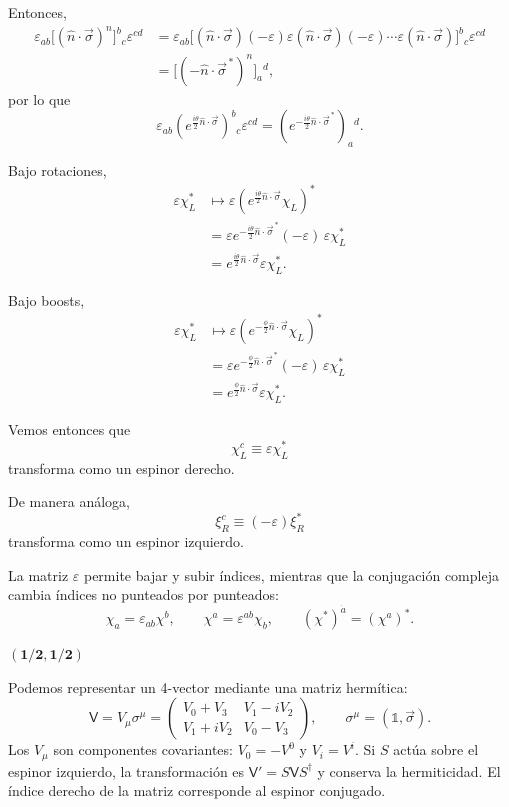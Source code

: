 \documentclass[11pt,a4paper]{article}
\begin{document}
Entonces,
\begin{align*}
  \varepsilon_{ab}
  \bigl[(\hat n\cdot\vec\sigma)^n\bigr]^b{}_c
  \varepsilon^{cd}
  &=\varepsilon_{ab}
    \bigl[(\hat n\cdot\vec\sigma)(-\varepsilon)
           \varepsilon(\hat n\cdot\vec\sigma)(-\varepsilon)
           \cdots
           \varepsilon(\hat n\cdot\vec\sigma)
    \bigr]^b{}_c
    \varepsilon^{cd} \\
  &=\bigl[(-\hat n\cdot\vec\sigma^{\,*})^n\bigr]_a{}^d,
\end{align*}
por lo que
\[
  \varepsilon_{ab}
  \left(e^{\frac{i\theta}{2}\hat n\cdot\vec\sigma}\right)^b{}_c
  \varepsilon^{cd}
  =
  \left(e^{-\frac{i\theta}{2}\hat n\cdot\vec\sigma^{\,*}}\right)_a{}^d.
\]

Bajo rotaciones,
\begin{align*}
  \varepsilon\chi_L^*
  &\longmapsto
  \varepsilon
  \left(e^{\frac{i\theta}{2}\hat n\cdot\vec\sigma}\chi_L\right)^* \\
  &=\varepsilon e^{-\frac{i\theta}{2}\hat n\cdot\vec\sigma^{\,*}}
    (-\varepsilon)\,\varepsilon\chi_L^* \\
  &=e^{\frac{i\theta}{2}\hat n\cdot\vec\sigma}\varepsilon\chi_L^*.
\end{align*}

Bajo boosts,
\begin{align*}
  \varepsilon\chi_L^*
  &\longmapsto
  \varepsilon
  \left(e^{-\frac{\phi}{2}\hat n\cdot\vec\sigma}\chi_L\right)^* \\
  &=\varepsilon e^{-\frac{\phi}{2}\hat n\cdot\vec\sigma^{\,*}}
    (-\varepsilon)\,\varepsilon\chi_L^* \\
  &=e^{\frac{\phi}{2}\hat n\cdot\vec\sigma}\varepsilon\chi_L^*.
\end{align*}

Vemos entonces que
\[
  \chi_L^c\equiv\varepsilon\chi_L^*
\]
transforma como un espinor derecho.

De manera análoga,
\[
  \xi_R^c\equiv(-\varepsilon)\xi_R^*
\]
transforma como un espinor izquierdo.

La matriz $\varepsilon$ permite bajar y subir índices, mientras que
la conjugación compleja cambia índices no punteados por punteados:
\[
  \chi_a=\varepsilon_{ab}\chi^b,\qquad
  \chi^a=\varepsilon^{ab}\chi_b,\qquad
  (\chi^*)^{\dot a}=(\chi^a)^*.
\]

{\bf $\boldsymbol{(1/2,1/2)}$}

Podemos representar un 4-vector mediante una matriz hermítica:
\[
  \mathsf V=V_\mu\sigma^\mu
  =\begin{pmatrix}
    V_0+V_3&V_1-iV_2\\
    V_1+iV_2&V_0-V_3
  \end{pmatrix},
  \qquad \sigma^\mu=(\mathbb1,\vec\sigma).
\]
Los $V_\mu$ son componentes covariantes: $V_0=-V^0$ y $V_i=V^i$.
Si $S$ actúa sobre el espinor izquierdo, la transformación es
$\mathsf V'=S\mathsf V S^\dagger$ y conserva la hermiticidad.
El índice derecho de la matriz corresponde al espinor conjugado.
\end{document}
